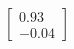 \documentclass[preview]{standalone}
\begin{document}
\begin{align*}
\begin{bmatrix} 0.93 \\ -0.04 \end{bmatrix}
\end{align*}
\end{document}
